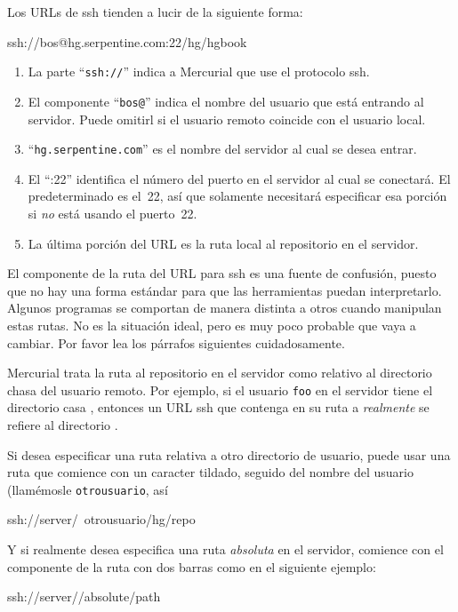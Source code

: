 Los URLs de ssh tienden a lucir de la siguiente forma:
\begin{codesample2}
  ssh://bos@hg.serpentine.com:22/hg/hgbook
\end{codesample2}
\begin{enumerate}
\item La parte ``\texttt{ssh://}'' indica a Mercurial que use el
  protocolo ssh.
\item El componente ``\texttt{bos@}'' indica el nombre del usuario que
  está entrando al servidor.  Puede omitirl si el usuario remoto
  coincide con el usuario local.
\item ``\texttt{hg.serpentine.com}'' es el nombre del servidor al cual
  se desea entrar.
\item El ``:22'' identifica el número del puerto en el servidor al cual
  se conectará.  El predeterminado es el~22, así que solamente
  necesitará especificar esa porción si \emph{no} está usando el
  puerto~22.
\item La última porción del URL es la ruta local al repositorio en el
  servidor.
\end{enumerate}

El componente de la ruta del URL para ssh es una fuente de confusión,
puesto que no hay una forma estándar para que las herramientas puedan
interpretarlo.  Algunos programas se comportan de manera distinta a
otros cuando manipulan estas rutas.  No es la situación ideal, pero
es muy poco probable que vaya a cambiar.  Por favor lea los párrafos
siguientes cuidadosamente.

Mercurial trata la ruta al repositorio en el servidor como relativo al
directorio chasa del usuario remoto.  Por ejemplo, si el usuario
\texttt{foo} en el servidor tiene el directorio casa
,
entonces un URL ssh que contenga en su ruta a 
\emph{realmente} se refiere al directorio .

Si desea especificar una ruta relativa a otro directorio de usuario,
puede usar una ruta que comience con un caracter tildado, seguido del
nombre del usuario (llamémosle \texttt{otrousuario}, así
\begin{codesample2}
  ssh://server/~otrousuario/hg/repo
\end{codesample2}

Y si realmente desea especifica una ruta \emph{absoluta} en el
servidor, comience con el componente de la ruta con dos barras como
en el siguiente ejemplo:
\begin{codesample2}
  ssh://server//absolute/path
\end{codesample2}

